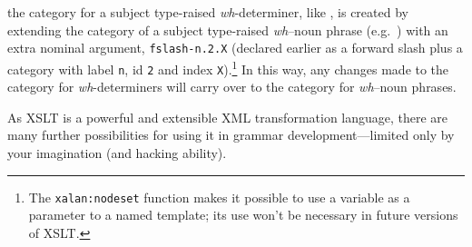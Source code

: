 \documentclass[11pt]{article}
\begin{document}
\noindent the category for a subject type-raised \emph{wh}-determiner,
like , is created by extending the category of a subject
type-raised \emph{wh}--noun phrase (e.g.\ ) with an extra
nominal argument, \texttt{fslash-n.2.X} (declared earlier as a forward
slash plus a category with label \texttt{n}, id \texttt{2} and index
\texttt{X}).\footnote{The \texttt{xalan:nodeset} function makes it
possible to use a variable as a parameter to a named template; its use
won't be necessary in future versions of XSLT.} In this way, any changes
made to the category for \emph{wh}-determiners will carry over to the
category for \emph{wh}--noun phrases.

As XSLT is a powerful and extensible XML transformation language, there
are many further possibilities for using it in grammar
development---limited only by your imagination (and hacking ability). 







\end{document}
